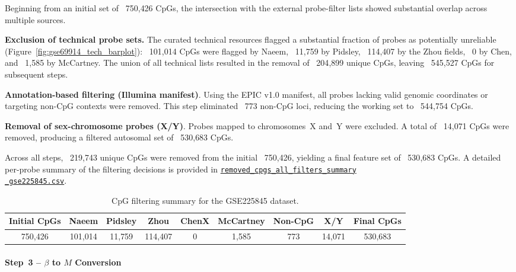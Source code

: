 \documentclass[10pt]{extarticle}
\newcommand{\good}[1]{\textcolor{teal!70!black}{\ding{51}~#1}}
\begin{document}
Beginning from an initial set of \good{750{,}426 CpGs}, the intersection with the external probe-filter lists 
showed substantial overlap across multiple sources.

\textbf{Exclusion of technical probe sets.}
The curated technical resources flagged a substantial fraction of probes as potentially unreliable (Figure~\ref{fig:gse69914_tech_barplot}): \good{101{,}014 CpGs} were flagged by Naeem, \good{11{,}759} by Pidsley, \good{114{,}407} by the Zhou fields, \good{0} by Chen, and \good{1{,}585} by McCartney. 
The union of all technical lists resulted in the removal of \good{204{,}899 unique CpGs}, 
leaving \good{545{,}527 CpGs} for subsequent steps.

\textbf{Annotation-based filtering (Illumina manifest)}.
Using the EPIC v1.0 manifest, all probes lacking valid genomic coordinates or 
targeting non-CpG contexts were removed.  
This step eliminated \good{773 non-CpG loci}, reducing the working set to \good{544{,}754 CpGs}.

\textbf{Removal of sex-chromosome probes (X/Y)}.
Probes mapped to chromosomes~X and~Y were excluded.  
A total of \good{14{,}071 CpGs} were removed, producing a filtered autosomal set of 
\good{530{,}683 CpGs}.

Across all steps, \good{219{,}743 unique CpGs} were removed from the initial \good{750{,}426}, 
yielding a final feature set of \good{530{,}683 CpGs}.  
A detailed per-probe summary of the filtering decisions is provided in  
\href{https://github.com/elisabettaroviera/THESIS/blob/main/05%
}
{\texttt{removed\_cpgs\_all\_filters\_summary\\\_gse225845.csv}}.

\begin{table}[t]
\centering
\caption{CpG filtering summary for the GSE225845 dataset.}
\label{tab:gse225845_cpg_filtering}
\begin{tabular}{c c c c c c c c c}
\hline
Initial CpGs &
Naeem &
Pidsley &
Zhou &
ChenX &
McCartney &
Non-CpG &
X/Y &
Final CpGs \\
\hline
750{,}426 &
101{,}014 &
11{,}759 &
114{,}407 &
0 &
1{,}585 &
773 &
14{,}071 &
530{,}683 \\
\hline
\end{tabular}
\end{table}


\paragraph{Step~3 -- $\beta$ to $M$ Conversion}
\label{par:gse225845_step4}
\end{document}
